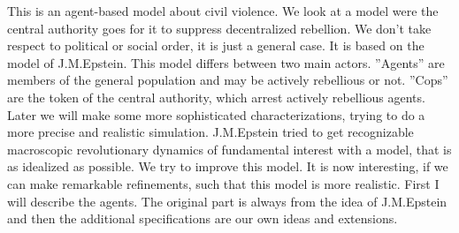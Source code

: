 \documentclass[11pt]{article}
\begin{document}
This is an agent-based model about civil violence. We look at a model were the central authority goes for it to suppress decentralized rebellion. We don't take respect to political or social order, it is just a general case. It is based on the model of J.M.Epstein.
This model differs between two main actors. ''Agents'' are members of the general population and may be actively rebellious or not. ''Cops'' are the token of the central authority, which arrest actively rebellious agents. Later we will make some more sophisticated characterizations, trying to do a more precise and realistic simulation. J.M.Epstein tried to get recognizable macroscopic revolutionary dynamics of fundamental interest with a model, that is as idealized as possible. We try to improve this model. It is now interesting, if we can make remarkable refinements, such that this model is more realistic. 
First I will describe the agents.
The original part is always from the idea of J.M.Epstein and then the additional specifications are our own ideas and extensions.
\end{document}
